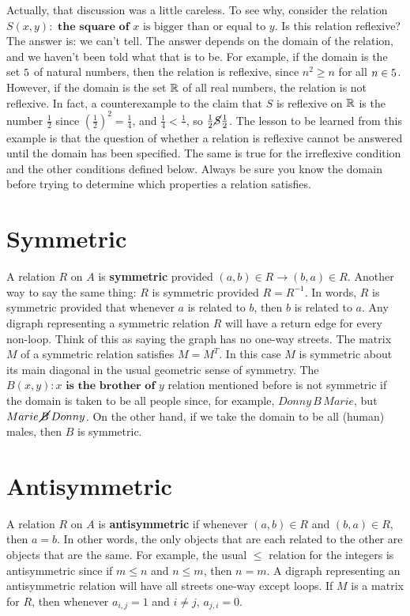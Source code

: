 Actually, that discussion was a little careless. To see why, consider the relation
$S(x,y) : \textbf{ the square of } x \text{ is bigger than or equal to } y$.
Is this relation reflexive? The answer is: we can't tell. The answer depends on the 
domain of the relation, and we haven't been told what that is to be. For example, if the
domain is the set $5$ of natural numbers, then the relation is reflexive, since
$n^2\geq n$ for all $n\in 5$. However, if the domain is  the set $\mathbb{R}$ of all
real numbers, the relation is not reflexive. In fact, a counterexample to the claim
that $S$ is reflexive on $\mathbb{R}$ is the number $\frac{1}{2}$ since
 $\left(\frac{1}{2}\right)^2 = \frac{1}{4}$, and
$\frac{1}{4} < \frac{1}{}$, so $\frac{1}{2}{\cancel{S}}\frac{1}{2}$. The lesson to be learned
from this example is that the question of whether a relation is reflexive cannot be
answered until the domain has been specified.  The same is true for the irreflexive condition
and the other conditions defined below. Always be sure you know the domain before
trying to determine which properties a relation satisfies. 


\section{Symmetric} 
A relation $R$ on $A$ is {\bfseries symmetric} provided $(a,b)\in R\to (b,a)\in R$. 
Another way to say the
same thing: $R$ is symmetric provided $R=R^{-1}$. In words, $R$ is symmetric provided that
whenever $a$ is related to $b$, then $b$ is related to $a$. 
Any digraph representing a symmetric relation $R$ will have a return edge for every non-loop.
Think of this as saying the graph has no one-way streets.
The matrix $M$ of a symmetric relation satisfies $M=M^T$.
In this case $M$ is symmetric about its main diagonal in the usual geometric sense of symmetry.
The $B(x,y): x \textbf{ is the brother of } y$ relation mentioned before is not
symmetric if the domain is taken to be all people since, for example, $Donny\,B\, Marie$,
but $Marie\,{\cancel{B}}\,Donny$. On the other hand, if we take the domain to be all (human)
males, then $B$ is symmetric. 

\section{Antisymmetric} 
A relation $R$ on $A$ is {\bfseries antisymmetric} if whenever $(a,b)\in R$ and $(b,a)\in R$,
then $a=b$.  In other words,  the only objects that are each related to the other
are objects that are the same. For example, the usual $\leq$ relation for the 
integers is antisymmetric since if $m\leq n$ and $n\leq m$, then $n=m$.  A digraph 
representing an
 antisymmetric relation will have all streets one-way except loops.
If $M$ is a matrix for $R$, then whenever $a_{i,j}=1$ and $i\neq j$, $a_{j,i}=0$.


